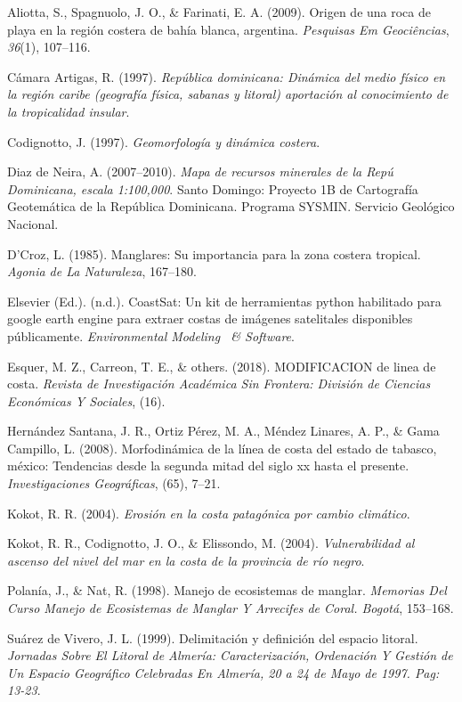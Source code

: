 \documentclass[11pt,]{article}
\begin{document}
\hypertarget{ref-aliotta2009origen}{}
Aliotta, S., Spagnuolo, J. O., \& Farinati, E. A. (2009). Origen de una
roca de playa en la región costera de bahía blanca, argentina.
\emph{Pesquisas Em Geociências}, \emph{36}(1), 107--116.

\hypertarget{ref-camara1997republica}{}
Cámara Artigas, R. (1997). \emph{República dominicana: Dinámica del
medio físico en la región caribe (geografía física, sabanas y litoral)
aportación al conocimiento de la tropicalidad insular}.

\hypertarget{ref-codignotto1997geomorfologia}{}
Codignotto, J. (1997). \emph{Geomorfología y dinámica costera}.

\hypertarget{ref-maparecursosminerales}{}
Diaz de Neira, A. (2007--2010). \emph{Mapa de recursos minerales de la
Repú Dominicana, escala 1:100,000}. Santo Domingo: Proyecto 1B de
Cartografía Geotemática de la República Dominicana. Programa SYSMIN.
Servicio Geológico Nacional.

\hypertarget{ref-d1985manglares}{}
D'Croz, L. (1985). Manglares: Su importancia para la zona costera
tropical. \emph{Agonia de La Naturaleza}, 167--180.

\hypertarget{ref-vos2019coastsat}{}
Elsevier (Ed.). (n.d.). CoastSat: Un kit de herramientas python
habilitado para google earth engine para extraer costas de imágenes
satelitales disponibles públicamente. \emph{Environmental Modeling ~\&
Software}.

\hypertarget{ref-esquer2018modificacion}{}
Esquer, M. Z., Carreon, T. E., \& others. (2018). MODIFICACION de linea
de costa. \emph{Revista de Investigación Académica Sin Frontera:
División de Ciencias Económicas Y Sociales}, (16).

\hypertarget{ref-hernandez2008morfodinamica}{}
Hernández Santana, J. R., Ortiz Pérez, M. A., Méndez Linares, A. P., \&
Gama Campillo, L. (2008). Morfodinámica de la línea de costa del estado
de tabasco, méxico: Tendencias desde la segunda mitad del siglo xx hasta
el presente. \emph{Investigaciones Geográficas}, (65), 7--21.

\hypertarget{ref-kokot2004erosion}{}
Kokot, R. R. (2004). \emph{Erosión en la costa patagónica por cambio
climático}.

\hypertarget{ref-kokot2004vulnerabilidad}{}
Kokot, R. R., Codignotto, J. O., \& Elissondo, M. (2004).
\emph{Vulnerabilidad al ascenso del nivel del mar en la costa de la
provincia de río negro}.

\hypertarget{ref-polania1998manejo}{}
Polanía, J., \& Nat, R. (1998). Manejo de ecosistemas de manglar.
\emph{Memorias Del Curso Manejo de Ecosistemas de Manglar Y Arrecifes de
Coral. Bogotá}, 153--168.

\hypertarget{ref-suarez1999delimitacion}{}
Suárez de Vivero, J. L. (1999). Delimitación y definición del espacio
litoral. \emph{Jornadas Sobre El Litoral de Almería: Caracterización,
Ordenación Y Gestión de Un Espacio Geográfico Celebradas En Almería, 20
a 24 de Mayo de 1997. Pag: 13-23}.




\newpage
\singlespacing 
\end{document}
